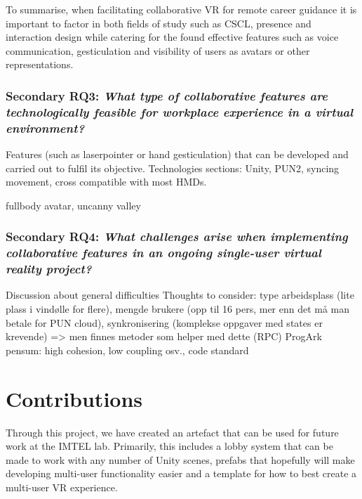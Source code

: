 To summarise, when facilitating collaborative VR for remote
career guidance it is important to factor in both fields of study such as CSCL, presence and interaction design while catering for the found effective features such as voice communication, gesticulation and visibility of users as avatars or other representations.   






\subsubsection{Secondary RQ3: \textit{What type of collaborative features are technologically feasible for workplace experience in a virtual environment?}} 
\label{discussion:RQ3}

Features (such as laserpointer or hand gesticulation) that can be developed and carried out to fulfil its objective.
Technologies sections: Unity, PUN2, syncing movement, cross compatible with most HMDs.  

fullbody avatar, uncanny valley 



\subsubsection{Secondary RQ4: \textit{What challenges arise when implementing collaborative features in an ongoing
single-user virtual reality project?}} 

Discussion about general difficulties
Thoughts to consider: type arbeidsplass (lite plass i vindølle for flere), mengde brukere (opp til 16 pers, mer enn det må man betale for PUN cloud), synkronisering (komplekse oppgaver med states er krevende) => men finnes metoder som helper med dette (RPC)
ProgArk pensum: high cohesion, low coupling osv., code standard


\section{Contributions}
Through this project, we have created an artefact that can be used for future work at the IMTEL lab. Primarily, this includes a lobby system that can be made to work with any number of Unity scenes, prefabs that hopefully will make developing multi-user functionality easier and a template for how to best create a multi-user VR experience. 

